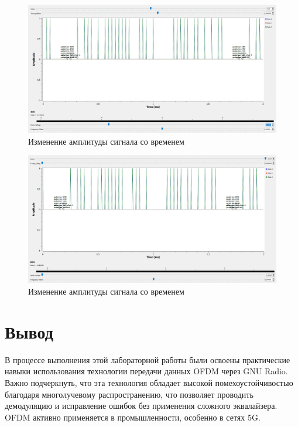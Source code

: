 \begin{figure}[H]
    \centering
    \includegraphics[width=1.0\linewidth]{Image4.png}
    \caption{Изменение амплитуды сигнала со временем}
    \label{fig:signal-amplitude3}
\end{figure}
\begin{figure}[H]
    \centering
    \includegraphics[width=1.0\linewidth]{Image5.png}
    \caption{Изменение амплитуды сигнала со временем}
    \label{fig:signal-amplitude4}
\end{figure}

\section{Вывод}
В процессе выполнения этой лабораторной работы были освоены практические навыки использования технологии передачи данных OFDM через GNU Radio. Важно подчеркнуть, что эта технология обладает высокой помехоустойчивостью благодаря многолучевому распространению, что позволяет проводить демодуляцию и исправление ошибок без применения сложного эквалайзера. OFDM активно применяется в промышленности, особенно в сетях 5G.